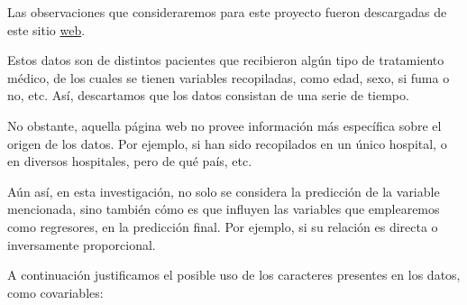\documentclass[
]{article}
\begin{document}
Las observaciones que consideraremos para este proyecto fueron
descargadas de este sitio
\href{https://www.kaggle.com/datasets/shubhamsingh57/ml-model-practice-linear-regression/data}{web}.

Estos datos son de distintos pacientes que recibieron algún tipo de
tratamiento médico, de los cuales se tienen variables recopiladas, como
edad, sexo, si fuma o no, etc. Así, descartamos que los datos consistan
de una serie de tiempo.

No obstante, aquella página web no provee información más específica
sobre el origen de los datos. Por ejemplo, si han sido recopilados en un
único hospital, o en diversos hospitales, pero de qué país, etc.

Aún así, en esta investigación, no solo se considera la predicción de la
variable mencionada, sino también cómo es que influyen las variables que
emplearemos como regresores, en la predicción final. Por ejemplo, si su
relación es directa o inversamente proporcional.

A continuación justificamos el posible uso de los caracteres presentes
en los datos, como covariables:
\end{document}
